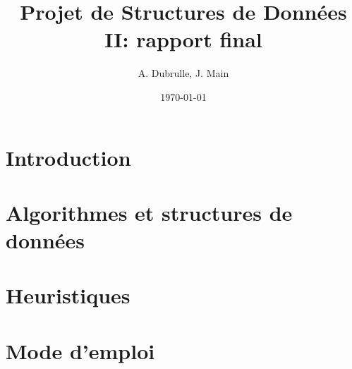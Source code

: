 \documentclass[a4paper, 12pt]{article}
\title{Projet de Structures de Données II: rapport final}
\author{A. Dubrulle, J. Main}
\date{\today}
\theoremstyle{definition} \newtheorem{df}{D\'{e}finition}[section]
\theoremstyle{definition} \newtheorem{ex}[df]{Exemple}
\theoremstyle{definition} \newtheorem{thm}[df]{Th\'{e}or\`{e}me}
\theoremstyle{definition} \newtheorem{cor}[df]{Corollaire}
\theoremstyle{definition} \newtheorem{lem}[df]{Lemme}
\theoremstyle{definition} \newtheorem{obs}[df]{Observation}
\theoremstyle{definition} \newtheorem{prop}[df]{Proposition}
\theoremstyle{definition} \newtheorem{rem}[df]{Remarque}
\begin{document}
\maketitle
\tableofcontents
\section{Introduction}


\section{Algorithmes et structures de données}

\section{Heuristiques}


\section{Mode d'emploi}


%
\end{document}
